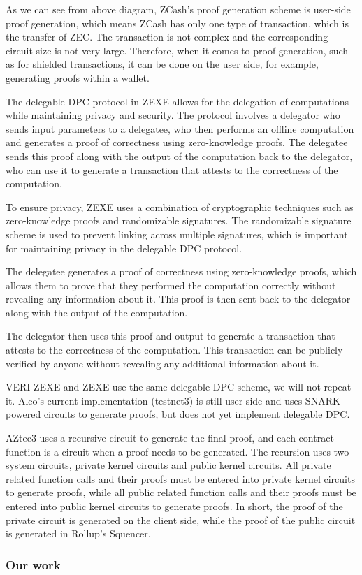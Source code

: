 As we can see from above diagram, ZCash's proof generation scheme is user-side proof generation, which means ZCash has only one type of transaction, which is the transfer of ZEC. The transaction is not complex and the corresponding circuit size is not very large. Therefore, when it comes to proof generation, such as for shielded transactions, it can be done on the user side, for example, generating proofs within a wallet.

The delegable DPC protocol in ZEXE \cite{cryptoeprint:2018/962} allows for the delegation of computations while maintaining privacy and security. The protocol involves a delegator who sends input parameters to a delegatee, who then performs an offline computation and generates a proof of correctness using zero-knowledge proofs. The delegatee sends this proof along with the output of the computation back to the delegator, who can use it to generate a transaction that attests to the correctness of the computation.

To ensure privacy, ZEXE uses a combination of cryptographic techniques such as zero-knowledge proofs and randomizable signatures. The randomizable signature scheme is used to prevent linking across multiple signatures, which is important for maintaining privacy in the delegable DPC protocol.

The delegatee generates a proof of correctness using zero-knowledge proofs, which allows them to prove that they performed the computation correctly without revealing any information about it. This proof is then sent back to the delegator along with the output of the computation.

The delegator then uses this proof and output to generate a transaction that attests to the correctness of the computation. This transaction can be publicly verified by anyone without revealing any additional information about it.

VERI-ZEXE and ZEXE use the same delegable DPC scheme, we will not repeat it. Aleo's current implementation (testnet3) is still user-side and uses SNARK-powered circuits to generate proofs, but does not yet implement delegable DPC.

AZtec3 \cite{website:aztec3} uses a recursive circuit to generate the final proof, and each contract function is a circuit when a proof needs to be generated. The recursion uses two system circuits, private kernel circuits and public kernel circuits. All private related function calls and their proofs must be entered into private kernel circuits to generate proofs, while all public related function calls and their proofs must be entered into public kernel circuits to generate proofs. In short, the proof of the private circuit is generated on the client side, while the proof of the public circuit is generated in Rollup's Squencer.

\subsubsection{Our work}